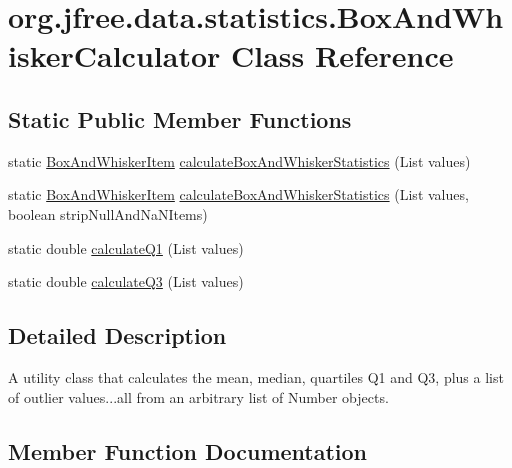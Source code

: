 \hypertarget{classorg_1_1jfree_1_1data_1_1statistics_1_1_box_and_whisker_calculator}{}\section{org.\+jfree.\+data.\+statistics.\+Box\+And\+Whisker\+Calculator Class Reference}
\label{classorg_1_1jfree_1_1data_1_1statistics_1_1_box_and_whisker_calculator}
\subsection*{Static Public Member Functions}
\begin{DoxyCompactItemize}
\item 
static \mbox{\hyperlink{classorg_1_1jfree_1_1data_1_1statistics_1_1_box_and_whisker_item}{Box\+And\+Whisker\+Item}} \mbox{\hyperlink{classorg_1_1jfree_1_1data_1_1statistics_1_1_box_and_whisker_calculator_a20ecd03bb4a9de9181bb655f19e8805f}{calculate\+Box\+And\+Whisker\+Statistics}} (List values)
\item 
static \mbox{\hyperlink{classorg_1_1jfree_1_1data_1_1statistics_1_1_box_and_whisker_item}{Box\+And\+Whisker\+Item}} \mbox{\hyperlink{classorg_1_1jfree_1_1data_1_1statistics_1_1_box_and_whisker_calculator_aac9bd67c9bd6f5ff2c79e226254f9e63}{calculate\+Box\+And\+Whisker\+Statistics}} (List values, boolean strip\+Null\+And\+Na\+N\+Items)
\item 
static double \mbox{\hyperlink{classorg_1_1jfree_1_1data_1_1statistics_1_1_box_and_whisker_calculator_a0298bf482027f1bdf377a80f84697364}{calculate\+Q1}} (List values)
\item 
static double \mbox{\hyperlink{classorg_1_1jfree_1_1data_1_1statistics_1_1_box_and_whisker_calculator_acf1792d89cb7bb1f41ccb1d054628f98}{calculate\+Q3}} (List values)
\end{DoxyCompactItemize}


\subsection{Detailed Description}
A utility class that calculates the mean, median, quartiles Q1 and Q3, plus a list of outlier values...all from an arbitrary list of {\ttfamily Number} objects. 

\subsection{Member Function Documentation}
\mbox{\label{classorg_1_1jfree_1_1data_1_1statistics_1_1_box_and_whisker_calculator_a20ecd03bb4a9de9181bb655f19e8805f}} 
